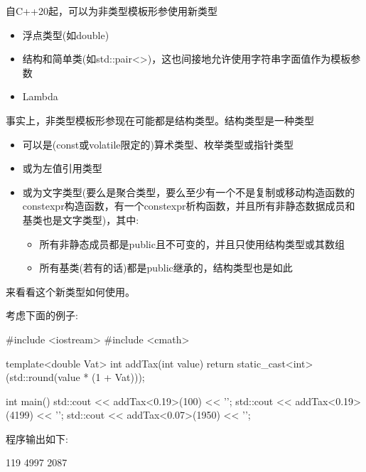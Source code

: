 
自C++20起，可以为非类型模板形参使用新类型

\begin{itemize}
\item
浮点类型(如double)

\item
结构和简单类(如std::pair<>)，这也间接地允许使用字符串字面值作为模板参数

\item
Lambda
\end{itemize}

事实上，非类型模板形参现在可能都是结构类型。结构类型是一种类型

\begin{itemize}
\item
可以是(const或volatile限定的)算术类型、枚举类型或指针类型

\item
或为左值引用类型

\item
或为文字类型(要么是聚合类型，要么至少有一个不是复制或移动构造函数的constexpr构造函数，有一个constexpr析构函数，并且所有非静态数据成员和基类也是文字类型)，其中:

\begin{itemize}
\item
所有非静态成员都是public且不可变的，并且只使用结构类型或其数组

\item
所有基类(若有的话)都是public继承的，结构类型也是如此
\end{itemize}
\end{itemize}

来看看这个新类型如何使用。


考虑下面的例子:


\begin{cpp}
#include <iostream>
#include <cmath>

template<double Vat>
int addTax(int value)
{
	return static_cast<int>(std::round(value * (1 + Vat)));
}

int main()
{
	std::cout << addTax<0.19>(100) << '\n';
	std::cout << addTax<0.19>(4199) << '\n';
	std::cout << addTax<0.07>(1950) << '\n';
}
\end{cpp}

程序输出如下:

\begin{shell}
119
4997
2087
\end{shell}

